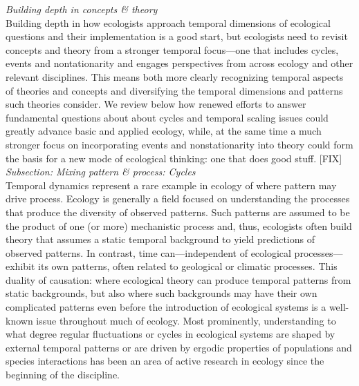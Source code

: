 \documentclass[11pt,a4paper,oneside]{article}
\begin{document}
\noindent \emph{Building depth in concepts \& theory}\\
Building depth in how ecologists approach temporal dimensions of ecological questions and their implementation is a good start, but ecologists need to revisit concepts and theory from a stronger temporal focus---one that includes cycles, events and nontationarity and engages perspectives from across ecology and other relevant disciplines. This means both more clearly recognizing temporal aspects of theories and concepts and diversifying the temporal dimensions and patterns such theories consider. We review below how renewed efforts to answer fundamental questions about about cycles and temporal scaling issues could greatly advance basic and applied ecology, while, at the same time a much stronger focus on incorporating events and nonstationarity into theory could form the basis for a new mode of ecological thinking: one that does good stuff. [FIX] \\

\noindent \emph{Subsection: Mixing pattern \& process: Cycles}\\ %
Temporal dynamics represent a rare example in ecology of where pattern may drive process. Ecology is generally a field focused on understanding the processes that produce the diversity of observed patterns. Such patterns are assumed to be the product of one (or more) mechanistic process and, thus, ecologists often build theory that assumes a static temporal background to yield predictions of observed patterns. In contrast, time can---independent of ecological processes---exhibit its own patterns, often related to geological or climatic processes. This duality of causation: where ecological theory can produce temporal patterns from static backgrounds, but also where such backgrounds may have their own complicated patterns even before the introduction of ecological systems is a well-known issue throughout much of ecology. Most prominently, understanding to what degree regular fluctuations or cycles in ecological systems are shaped by external temporal patterns or are driven by ergodic properties of populations and species interactions has been an area of active research in ecology since the beginning of the discipline. \\
\end{document}
